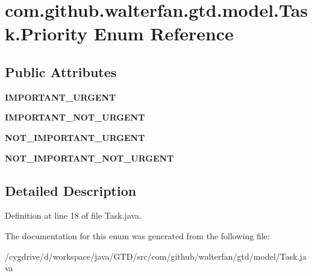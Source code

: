 \hypertarget{enumcom_1_1github_1_1walterfan_1_1gtd_1_1model_1_1Task_1_1Priority}{\section{com.\-github.\-walterfan.\-gtd.\-model.\-Task.\-Priority Enum Reference}
\label{enumcom_1_1github_1_1walterfan_1_1gtd_1_1model_1_1Task_1_1Priority}
}
\subsection*{Public Attributes}
\begin{DoxyCompactItemize}
\item 
\hypertarget{enumcom_1_1github_1_1walterfan_1_1gtd_1_1model_1_1Task_1_1Priority_a5bd4f3d1449dac07f6e7d84d6c67f291}{{\bfseries I\-M\-P\-O\-R\-T\-A\-N\-T\-\_\-\-U\-R\-G\-E\-N\-T}}\label{enumcom_1_1github_1_1walterfan_1_1gtd_1_1model_1_1Task_1_1Priority_a5bd4f3d1449dac07f6e7d84d6c67f291}

\item 
\hypertarget{enumcom_1_1github_1_1walterfan_1_1gtd_1_1model_1_1Task_1_1Priority_ad5cda79ea9d8aa8ef835107c90644626}{{\bfseries I\-M\-P\-O\-R\-T\-A\-N\-T\-\_\-\-N\-O\-T\-\_\-\-U\-R\-G\-E\-N\-T}}\label{enumcom_1_1github_1_1walterfan_1_1gtd_1_1model_1_1Task_1_1Priority_ad5cda79ea9d8aa8ef835107c90644626}

\item 
\hypertarget{enumcom_1_1github_1_1walterfan_1_1gtd_1_1model_1_1Task_1_1Priority_a010ca9f21f1c8e758252a5a149829077}{{\bfseries N\-O\-T\-\_\-\-I\-M\-P\-O\-R\-T\-A\-N\-T\-\_\-\-U\-R\-G\-E\-N\-T}}\label{enumcom_1_1github_1_1walterfan_1_1gtd_1_1model_1_1Task_1_1Priority_a010ca9f21f1c8e758252a5a149829077}

\item 
\hypertarget{enumcom_1_1github_1_1walterfan_1_1gtd_1_1model_1_1Task_1_1Priority_a0fa45bdfaf8042d4b17bb6e6abfee6ca}{{\bfseries N\-O\-T\-\_\-\-I\-M\-P\-O\-R\-T\-A\-N\-T\-\_\-\-N\-O\-T\-\_\-\-U\-R\-G\-E\-N\-T}}\label{enumcom_1_1github_1_1walterfan_1_1gtd_1_1model_1_1Task_1_1Priority_a0fa45bdfaf8042d4b17bb6e6abfee6ca}

\end{DoxyCompactItemize}


\subsection{Detailed Description}


Definition at line 18 of file Task.\-java.



The documentation for this enum was generated from the following file\-:\begin{DoxyCompactItemize}
\item 
/cygdrive/d/workspace/java/\-G\-T\-D/src/com/github/walterfan/gtd/model/Task.\-java\end{DoxyCompactItemize}
